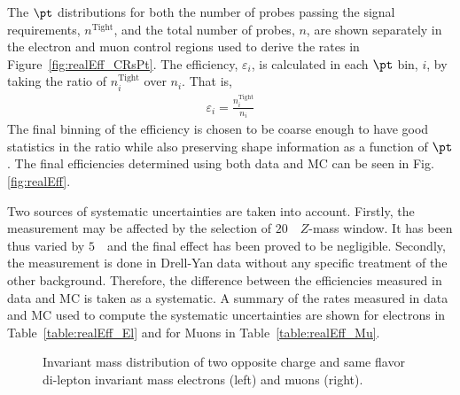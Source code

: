 The $\pt$ distributions for both the number of probes passing the signal requirements, $n^{\mathrm{Tight}}$, and the total number of probes, $n$, are shown separately in the electron and muon control regions used to derive the rates in Figure~\ref{fig:realEff_CRsPt}.
The efficiency, $\varepsilon_i$, is calculated in each $\pt$ bin, $i$, by taking the ratio of $n_{i}^{\mathrm{Tight}}$ over $n_i$. That is,
\begin{align*}
\varepsilon_i=\frac{n_{i}^{\mathrm{Tight}}}{n_{i}}
\end{align*}
The final binning of the efficiency is chosen to be coarse enough
to have good statistics in the ratio while also preserving shape information as a function
of $\pt$. 
The final efficiencies determined using both data and MC 
can be seen in Fig. \ref{fig:realEff}.

Two sources of systematic uncertainties are taken into account. Firstly, the measurement may be affected by the selection of $20$~\GeV\ $Z$-mass window. It has been thus varied by $5$~\GeV\ and the final effect has been proved to be negligible. Secondly, the measurement is done in Drell-Yan data without any  specific treatment of the other background. Therefore, the difference between the efficiencies measured in data and MC is taken as a systematic.  A summary of the rates measured in
data and MC used to compute the systematic uncertainties are shown for electrons
in Table~\ref{table:realEff_El} and for Muons in Table~\ref{table:realEff_Mu}.

\begin{figure}[h!]
\centering
{}
\centering
{}
\vspace{-10mm}\caption{Invariant mass distribution of two opposite charge and same flavor di-lepton invariant mass electrons (left) and muons (right).}
\label{fig:realEff_CRs}
\end{figure}



